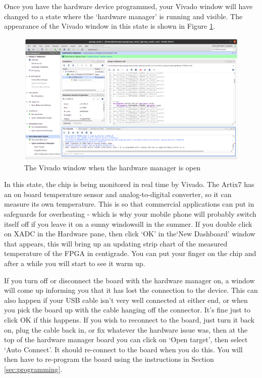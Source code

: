 \documentclass[../physical_computing.tex]{subfiles}
\begin{document}
Once you have the hardware device programmed, your Vivado window will have changed to a state where the `hardware manager' is running and visible. The appearance of the Vivado window in this state is shown in Figure \ref{fig:hardware_manager}. 

\begin{figure}[htbp]
    \centering
    \includegraphics[width=\textwidth]{figures/hardware_manager.png}
    \caption{The Vivado window when the hardware manager is open}
    \label{fig:hardware_manager}
\end{figure}

In this state, the chip is being monitored in real time by Vivado. The Artix7 has an on board temperature sensor and analog-to-digital converter, so it can measure its own temperature. This is so that commercial applications can put in safeguards for overheating - which is why your mobile phone will probably switch itself off if you leave it on a sunny windowsill in the summer. If you double click on XADC in the Hardware pane, then click `OK' in the`New Dashboard' window that appears, this will bring up an updating strip chart of the measured temperature of the FPGA in centigrade. You can put your finger on the chip and after a while you will start to see it warm up. 

If you turn off or disconnect the board with the hardware manager on, a window will come up informing you that it has lost the connection to the device. This can also happen if your USB cable isn't very well connected at either end, or when you pick the board up with the cable hanging off the connector. It's fine just to click OK if this happens. If you wish to reconnect to the board, just turn it back on, plug the cable back in, or fix whatever the hardware issue was, then at the top of the hardware manager board you can click on `Open target', then select `Auto Connect'. It should re-connect to the board when you do this. You will then have to re-program the board using the instructions in Section \ref{sec:programming}. 
\end{document}
